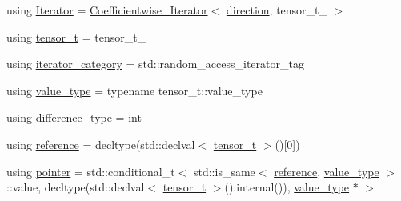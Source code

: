 \begin{DoxyCompactItemize}
\item 
using \hyperlink{structBC_1_1tensors_1_1iterators_1_1Coefficientwise__Iterator_a9ccb8846c1ea7610ba2a644bc38d6193}{Iterator} = \hyperlink{structBC_1_1tensors_1_1iterators_1_1Coefficientwise__Iterator}{Coefficientwise\+\_\+\+Iterator}$<$ \hyperlink{namespaceBC_1_1tensors_1_1iterators_adbaa579cf4202e9bf262b436879f0f91}{direction}, tensor\+\_\+t\+\_\+ $>$
\item 
using \hyperlink{structBC_1_1tensors_1_1iterators_1_1Coefficientwise__Iterator_a9274edbb77b7745545324238ef50c648}{tensor\+\_\+t} = tensor\+\_\+t\+\_\+
\item 
using \hyperlink{structBC_1_1tensors_1_1iterators_1_1Coefficientwise__Iterator_a3f738632b48d6edd83ecffd1d3f9ba10}{iterator\+\_\+category} = std\+::random\+\_\+access\+\_\+iterator\+\_\+tag
\item 
using \hyperlink{structBC_1_1tensors_1_1iterators_1_1Coefficientwise__Iterator_a24bc25cd44f7fe6dd510619e977c89ad}{value\+\_\+type} = typename tensor\+\_\+t\+::value\+\_\+type
\item 
using \hyperlink{structBC_1_1tensors_1_1iterators_1_1Coefficientwise__Iterator_a0fc7095b3d3e027eba629feebd0cbbfa}{difference\+\_\+type} = int
\item 
using \hyperlink{structBC_1_1tensors_1_1iterators_1_1Coefficientwise__Iterator_a98b19a44326b9b99192878436b443e8c}{reference} = decltype(std\+::declval$<$ \hyperlink{structBC_1_1tensors_1_1iterators_1_1Coefficientwise__Iterator_a9274edbb77b7745545324238ef50c648}{tensor\+\_\+t} $>$()\mbox{[}0\mbox{]})
\item 
using \hyperlink{structBC_1_1tensors_1_1iterators_1_1Coefficientwise__Iterator_a1221994e154ab3f77cb6a43198db8acc}{pointer} = std\+::conditional\+\_\+t$<$ std\+::is\+\_\+same$<$ \hyperlink{structBC_1_1tensors_1_1iterators_1_1Coefficientwise__Iterator_a98b19a44326b9b99192878436b443e8c}{reference}, \hyperlink{structBC_1_1tensors_1_1iterators_1_1Coefficientwise__Iterator_a24bc25cd44f7fe6dd510619e977c89ad}{value\+\_\+type} $>$\+::value, decltype(std\+::declval$<$ \hyperlink{structBC_1_1tensors_1_1iterators_1_1Coefficientwise__Iterator_a9274edbb77b7745545324238ef50c648}{tensor\+\_\+t} $>$().internal()), \hyperlink{structBC_1_1tensors_1_1iterators_1_1Coefficientwise__Iterator_a24bc25cd44f7fe6dd510619e977c89ad}{value\+\_\+type} $\ast$ $>$
\end{DoxyCompactItemize}
